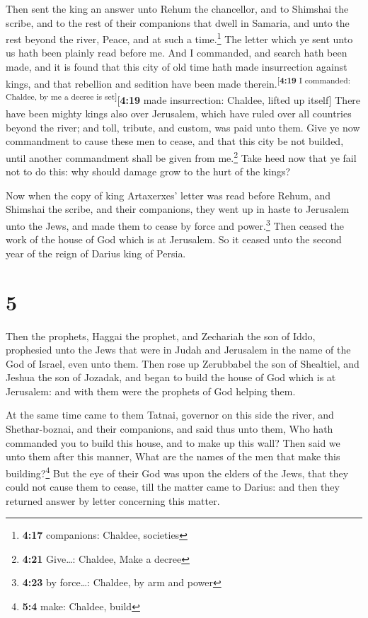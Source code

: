  Then sent the king an answer unto Rehum the chancellor,
and to Shimshai the scribe, and to the rest of their companions that
dwell in Samaria, and unto the rest beyond the river, Peace, and at such
a time.\footnote{\textbf{4:17} companions: Chaldee, societies}
 The letter which ye sent unto us hath been plainly read
before me.  And I commanded, and search hath been made,
and it is found that this city of old time hath made insurrection
against kings, and that rebellion and sedition have been made
therein.\textsuperscript{{[}\textbf{4:19} I commanded: Chaldee, by me a
decree is set{]}}{[}\textbf{4:19} made insurrection: Chaldee, lifted up
itself{]}  There have been mighty kings also over
Jerusalem, which have ruled over all countries beyond the river; and
toll, tribute, and custom, was paid unto them.  Give ye
now commandment to cause these men to cease, and that this city be not
builded, until another commandment shall be given from me.\footnote{\textbf{4:21}
  Give\ldots: Chaldee, Make a decree}  Take heed now that
ye fail not to do this: why should damage grow to the hurt of the kings?

 Now when the copy of king Artaxerxes' letter was read
before Rehum, and Shimshai the scribe, and their companions, they went
up in haste to Jerusalem unto the Jews, and made them to cease by force
and power.\footnote{\textbf{4:23} by force\ldots: Chaldee, by arm and
  power}  Then ceased the work of the house of God which
is at Jerusalem. So it ceased unto the second year of the reign of
Darius king of Persia.

\hypertarget{section-4}{%
\section{5}\label{section-4}}

 Then the prophets, Haggai the prophet, and Zechariah the
son of Iddo, prophesied unto the Jews that were in Judah and Jerusalem
in the name of the God of Israel, even unto them.  Then
rose up Zerubbabel the son of Shealtiel, and Jeshua the son of Jozadak,
and began to build the house of God which is at Jerusalem: and with them
were the prophets of God helping them.

 At the same time came to them Tatnai, governor on this
side the river, and Shethar-boznai, and their companions, and said thus
unto them, Who hath commanded you to build this house, and to make up
this wall?  Then said we unto them after this manner, What
are the names of the men that make this building?\footnote{\textbf{5:4}
  make: Chaldee, build}  But the eye of their God was upon
the elders of the Jews, that they could not cause them to cease, till
the matter came to Darius: and then they returned answer by letter
concerning this matter.

